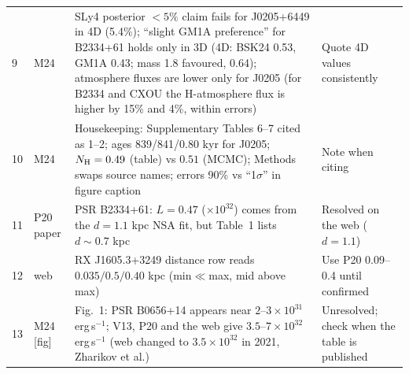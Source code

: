\documentclass[11pt,a4paper]{article}
\newcommand{\src}[1]{\textsf{[#1]}}
\begin{document}
\begin{longtable}{P{0.9cm}P{2.0cm}P{6.2cm}P{4.4cm}}
9 & M24 & SLy4 posterior $<5\%$ claim fails for J0205+6449 in 4D (5.4\%); ``slight GM1A preference'' for B2334+61 holds only in 3D (4D: BSK24 0.53, GM1A 0.43; mass 1.8 favoured, 0.64); atmosphere fluxes are lower only for J0205 (for B2334 and CXOU the H-atmosphere flux is higher by 15\% and 4\%, within errors) & Quote 4D values consistently \\
10 & M24 & Housekeeping: Supplementary Tables 6--7 cited as 1--2; ages 839/841/0.80 kyr for J0205; $N_{\rm H}=0.49$ (table) vs $0.51$ (MCMC); Methods swaps source names; errors 90\% vs ``1$\sigma$'' in figure caption & Note when citing \\
11 & P20 paper & PSR B2334+61: $L=0.47$ ($\times10^{32}$) comes from the $d=1.1$ kpc NSA fit, but Table~1 lists $d\sim0.7$ kpc & Resolved on the web ($d=1.1$) \\
12 & web & RX J1605.3+3249 distance row reads $0.035/0.5/0.40$ kpc (min$\ll$max, mid above max) & Use P20 0.09--0.4 until confirmed \\
13 & M24 \src{fig} & Fig.~1: PSR B0656+14 appears near $2$--$3\times10^{31}$ erg\,s$^{-1}$; V13, P20 and the web give $3.5$--$7\times10^{32}$ erg\,s$^{-1}$ (web changed to $3.5\times10^{32}$ in 2021, Zharikov et al.) & Unresolved; check when the table is published \\
\bottomrule
\end{longtable}
\end{document}
